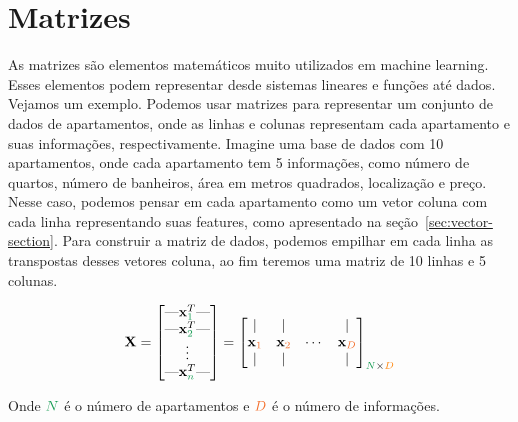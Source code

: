 \section{Matrizes}
As matrizes são elementos matemáticos muito utilizados em machine learning. Esses elementos podem representar desde sistemas lineares e funções até dados. Vejamos um exemplo. Podemos usar matrizes para representar um conjunto de dados de apartamentos, onde as linhas e colunas representam cada apartamento e suas informações, respectivamente. Imagine uma base de dados com 10 apartamentos, onde cada apartamento tem 5 informações, como número de quartos, número de banheiros, área em metros quadrados, localização e preço. Nesse caso, podemos pensar em cada apartamento como um vetor coluna com cada linha representando suas features, como apresentado na seção~\ref{sec:vector-section}. Para construir a matriz de dados, podemos empilhar em cada linha as transpostas desses vetores coluna, ao fim teremos uma matriz de 10 linhas e 5 colunas.

\vspace{1cm}

\begin{equation}
\begin{aligned}
\mathbf{X} = \begin{bmatrix}
    \mbox{---}  \mathbf{x}^T_{\mathcolor{ForestGreen}{1}} \mbox{---}  \\
     \mbox{---}  \mathbf{x}^T_{\mathcolor{ForestGreen}{2}} \mbox{---}  \\
    \vdots \\
     \mbox{---}  \mathbf{x}^T_{\mathcolor{ForestGreen}{n}} \mbox{---}  \\
\end{bmatrix} 
=
\begin{bmatrix}
    \,|\, & \,|\, &        & \,|\, \\
    \mathbf{x}_{\mathcolor{Orange}{1}} 
        & \mathbf{x}_{\mathcolor{Orange}{2}}
        & \cdots 
        & \mathbf{x}_{\mathcolor{Orange}{D}} \\
    \,|\, & \,|\, &        & \,|\, \\
\end{bmatrix}_{\mathcolor{ForestGreen}{N}\times\mathcolor{orange}{D}}
\end{aligned}
\end{equation}

\vspace{1cm}

Onde $\mathcolor{ForestGreen}{N}$ é o número de apartamentos e $\mathcolor{Orange}{D}$ é o número de informações.


